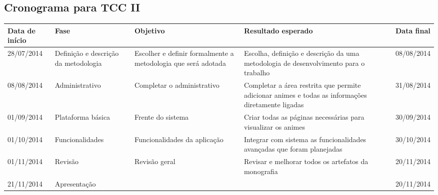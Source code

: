 \documentclass[
	12pt,				%
	openright,			%
	twoside,			%
	a4paper,			%
	Times,
	brazil,				%
	]{abntex2}
\begin{document}
\begin{apendicesenv}
\partapendices

\chapter{Cronograma para TCC II}

\begin{center}
	\begin{tabularx}{\textwidth}{|X|X|X|X|X|}
		\hline
		
		Data de início & Fase & Objetivo & Resultado esperado & Data final \\ \hline
		
		28/07/2014 & Definição e descrição da metodologia & Escolher e definir formalmente a metodologia que será adotada & Escolha, definição e descrição da uma metodologia de desenvolvimento para o trabalho & 08/08/2014 \\ \hline
		
		08/08/2014 & Administrativo & Completar o administrativo & Completar a área restrita que permite adicionar animes e todas as informações diretamente ligadas & 31/08/2014 \\ \hline
		
		01/09/2014 & Plataforma básica & Frente do sistema & Criar todas as páginas necessárias para visualizar os animes & 30/09/2014 \\ \hline

		01/10/2014 & Funcionalidades & Funcionalidades da aplicação & Integrar com sistema as funcionalidades avançadas que foram planejadas & 30/10/2014 \\ \hline

		01/11/2014 & Revisão & Revisão geral & Revisar e melhorar todos os artefatos da monografia & 20/11/2014 \\ \hline
		
		21/11/2014 & Apresentação &  &  & 20/11/2014 \\ \hline



	\end{tabularx}
\end{center}


\end{apendicesenv}
\end{document}
